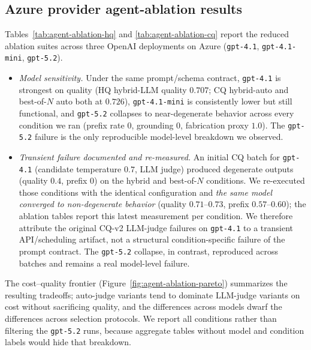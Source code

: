 \subsection{Azure provider agent-ablation results}
Tables~\ref{tab:agent-ablation-hq} and \ref{tab:agent-ablation-cq} report the reduced ablation suites across three OpenAI deployments on Azure (\texttt{gpt-4.1}, \texttt{gpt-4.1-mini}, \texttt{gpt-5.2}).
\begin{itemize}
  \item \emph{Model sensitivity.} Under the same prompt/schema contract, \texttt{gpt-4.1} is strongest on quality (HQ hybrid-LLM quality $0.707$; CQ hybrid-auto and best-of-$N$ auto both at $0.726$), \texttt{gpt-4.1-mini} is consistently lower but still functional, and \texttt{gpt-5.2} collapses to near-degenerate behavior across every condition we ran (prefix rate $0$, grounding $0$, fabrication proxy $1.0$). The \texttt{gpt-5.2} failure is the only reproducible model-level breakdown we observed.
  \item \emph{Transient failure documented and re-measured.} An initial CQ batch for \texttt{gpt-4.1} (candidate temperature $0.7$, LLM judge) produced degenerate outputs (quality $0.4$, prefix $0$) on the hybrid and best-of-$N$ conditions. We re-executed those conditions with the identical configuration and \emph{the same model converged to non-degenerate behavior} (quality $0.71$--$0.73$, prefix $0.57$--$0.60$); the ablation tables report this latest measurement per condition. We therefore attribute the original CQ-v2 LLM-judge failures on \texttt{gpt-4.1} to a transient API/scheduling artifact, not a structural condition-specific failure of the prompt contract. The \texttt{gpt-5.2} collapse, in contrast, reproduced across batches and remains a real model-level failure.
\end{itemize}
The cost--quality frontier (Figure~\ref{fig:agent-ablation-pareto}) summarizes the resulting tradeoffs; auto-judge variants tend to dominate LLM-judge variants on cost without sacrificing quality, and the differences across models dwarf the differences across selection protocols. We report all conditions rather than filtering the \texttt{gpt-5.2} runs, because aggregate tables without model and condition labels would hide that breakdown.

